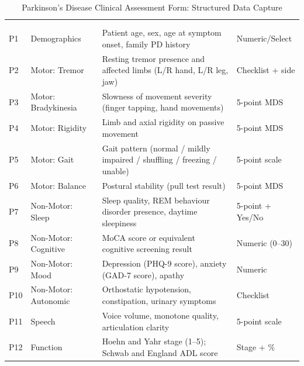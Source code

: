 {\tablestripes\tablefontsize
\begin{xltabular}{\textwidth}{@{} >{\raggedright\arraybackslash}p{0.5cm} >{\raggedright\arraybackslash}p{2.0cm} L p{1.4cm} @{}}
\caption{Parkinson's Disease Clinical Assessment Form: Structured Data Capture}\label{app_tab:pd_form} \\
\toprule
\thead{\#} &  &  &  \\
\midrule
\endfirsthead
{} \\
\toprule
\thead{\#} &  &  &  \\
\midrule
\endhead
\bottomrule
\endlastfoot
P1 & Demographics & Patient age, sex, age at symptom onset, family PD history & Numeric/Select \\
\addlinespace
P2 & Motor: Tremor & Resting tremor presence and affected limbs (L/R hand, L/R leg, jaw) & Checklist + side \\
\addlinespace
P3 & Motor: Bradykinesia & Slowness of movement severity (finger tapping, hand movements) & 5-point MDS \\
\addlinespace
P4 & Motor: Rigidity & Limb and axial rigidity on passive movement & 5-point MDS \\
\addlinespace
P5 & Motor: Gait & Gait pattern (normal / mildly impaired / shuffling / freezing / unable) & 5-point scale \\
\addlinespace
P6 & Motor: Balance & Postural stability (pull test result) & 5-point MDS \\
\addlinespace
P7 & Non-Motor: Sleep & Sleep quality, REM behaviour disorder presence, daytime sleepiness & 5-point + Yes/No \\
\addlinespace
P8 & Non-Motor: Cognitive & MoCA score or equivalent cognitive screening result & Numeric (0--30) \\
\addlinespace
P9 & Non-Motor: Mood & Depression (PHQ-9 score), anxiety (GAD-7 score), apathy & Numeric \\
\addlinespace
P10 & Non-Motor: Autonomic & Orthostatic hypotension, constipation, urinary symptoms & Checklist \\
\addlinespace
P11 & Speech & Voice volume, monotone quality, articulation clarity & 5-point scale \\
\addlinespace
P12 & Function & Hoehn and Yahr stage (1--5); Schwab and England ADL score & Stage + \% \\

\end{xltabular}}
